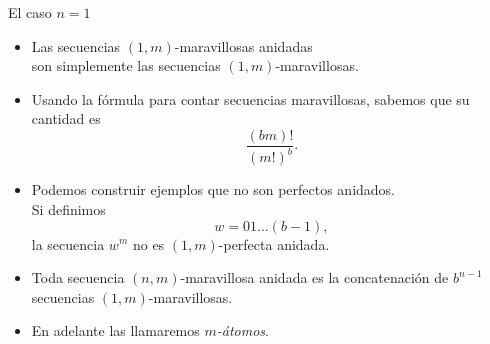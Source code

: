 \documentclass[spanish,xcolor={table}]{beamer}
\begin{document}
\begin{frame}{El caso $n = 1$}

\begin{itemize}
  \item Las secuencias $(1,m)$-maravillosas anidadas \\
  son simplemente las secuencias $(1,m)$-maravillosas.
  \item Usando la fórmula para contar secuencias maravillosas, sabemos que
  su cantidad es
  \[ \frac{(bm)! }{(m!)^b}. \]
  \item Podemos construir ejemplos que no son perfectos anidados. \\
  Si definimos
  \[ w = 01\dots(b-1), \]
  la secuencia $w^m$ no es $(1,m)$-perfecta anidada.
  \item Toda secuencia $(n,m)$-maravillosa anidada es la concatenación de
  $b^{n-1}$ secuencias $(1,m)$-maravillosas.
  \item En adelante las llamaremos \emph{$m$-átomos}.
\end{itemize}

\end{frame}

\end{document}
